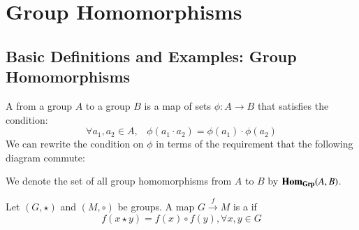 \chapter{ Group Homomorphisms}
\label{GrpHoms}
\section{ Basic Definitions and Examples: Group Homomorphisms}

\begin{definition}[A]
    A  from a group $A$ to a group $B$ is a map of sets $\phi:A\rightarrow B$ that satisfies the condition: \begin{equation}
        \forall a_1,a_2\in A,\;\;\;\phi(a_1\cdot a_2) = \phi(a_1)\cdot \phi(a_2)
    \end{equation}
    We can rewrite the condition on $\phi$ in terms of the requirement that the following diagram commute: \begin{center}
        \end{center}
        We denote the set of all group homomorphisms from $A$ to $B$ by $\mathbf{Hom}_{\normalfont\textbf{Grp}}(A,B)$.
\end{definition}


\begin{definition}[B]
    Let $(G,\star)$ and $(M,\circ)$ be groups. A map $G\xrightarrow{f} M$ is a  if \begin{equation}
        f(x\star y) = f(x)\circ f(y),\forall x,y \in G
    \end{equation} 
\end{definition}


